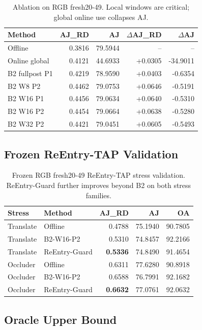 \documentclass[10pt,twocolumn]{article}
\begin{document}
\begin{table}[h]
\centering
\small
\begin{tabular}{lrrrr}
\toprule
Method & AJ\_RD & AJ & $\Delta$AJ\_RD & $\Delta$AJ \\
\midrule
Offline & 0.3816 & 79.5944 & -- & -- \\
Online global & 0.4121 & 44.6933 & +0.0305 & -34.9011 \\
B2 fullpost P1 & 0.4219 & 78.9590 & +0.0403 & -0.6354 \\
B2 W8 P2 & 0.4462 & 79.0753 & +0.0646 & -0.5191 \\
B2 W16 P1 & 0.4456 & 79.0634 & +0.0640 & -0.5310 \\
B2 W16 P2 & 0.4454 & 79.0664 & +0.0638 & -0.5280 \\
B2 W32 P2 & 0.4421 & 79.0451 & +0.0605 & -0.5493 \\
\bottomrule
\end{tabular}
\caption{Ablation on RGB fresh20-49. Local windows are critical; global online use collapses AJ.}
\end{table}

\subsection{Frozen ReEntry-TAP Validation}

\begin{table}[h]
\centering
\small
\begin{tabular}{llrrr}
\toprule
Stress & Method & AJ\_RD & AJ & OA \\
\midrule
Translate & Offline & 0.4788 & 75.1940 & 90.7805 \\
Translate & B2-W16-P2 & 0.5310 & 74.8457 & 92.2166 \\
Translate & ReEntry-Guard & \textbf{0.5336} & 74.8490 & 91.4654 \\
Occluder & Offline & 0.6311 & 77.6280 & 90.8918 \\
Occluder & B2-W16-P2 & 0.6588 & 76.7991 & 92.1682 \\
Occluder & ReEntry-Guard & \textbf{0.6632} & 77.0761 & 92.0632 \\
\bottomrule
\end{tabular}
\caption{Frozen RGB fresh20-49 ReEntry-TAP stress validation. ReEntry-Guard further improves beyond B2 on both stress families.}
\end{table}

\subsection{Oracle Upper Bound}
\end{document}

